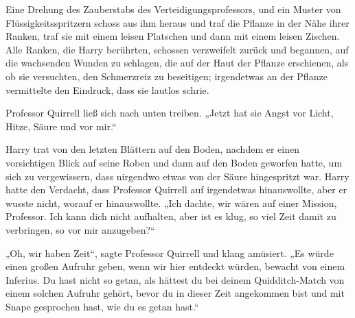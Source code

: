 Eine Drehung des Zauberstabs des Verteidigungsprofessors, und ein Muster von Flüssigkeitsspritzern schoss aus ihm heraus und traf die Pflanze in der Nähe ihrer Ranken, traf sie mit einem leisen Platschen und dann mit einem leisen Zischen.
Alle Ranken, die Harry berührten, schossen verzweifelt zurück und begannen, auf die wachsenden Wunden zu schlagen, die auf der Haut der Pflanze erschienen, als ob sie versuchten, den Schmerzreiz zu beseitigen; irgendetwas an der Pflanze vermittelte den Eindruck, dass sie lautlos schrie.

Professor Quirrell ließ sich nach unten treiben.
„Jetzt hat sie Angst vor Licht, Hitze, Säure und vor mir.“

Harry trat von den letzten Blättern auf den Boden, nachdem er einen vorsichtigen Blick auf seine Roben und dann auf den Boden geworfen hatte, um sich zu vergewissern, dass nirgendwo etwas von der Säure hingespritzt war. Harry hatte den Verdacht, dass Professor Quirrell auf irgendetwas hinauswollte, aber er wusste nicht, worauf er hinauswollte.
„Ich dachte, wir wären auf einer Mission, Professor. Ich kann dich nicht aufhalten, aber ist es klug, so viel Zeit damit zu verbringen, so vor mir anzugeben?“

„Oh, wir haben Zeit“, sagte Professor Quirrell und klang amüsiert. „Es würde einen großen Aufruhr geben, wenn wir hier entdeckt würden, bewacht von einem Inferius. Du hast nicht so getan, als hättest du bei deinem Quidditch-Match von einem solchen Aufruhr gehört, bevor du in dieser Zeit angekommen bist und mit Snape gesprochen hast, wie du es getan hast.“

